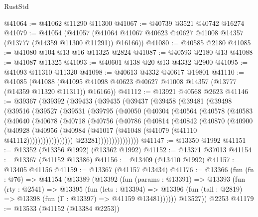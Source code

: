 \begin{lexlean}{RustStd}
\begin{coremodule}
@41064 := @41062 @11290 @11300
@41067 := @40739 @3521 @40742 @16274
@41079 := @41054
    (@41057 (@41064 @41067 @40623 @40627 @41008 @14357 (@13777 (@14359 @11300 @11291)) @16166))
@41080 := @40585 @2180
@41085 := @41080 @104 @13 @16 @11325 @2824
@41087 := @40593 @2180 @13
@41088 := @41087 @11325
@41093 := @40601 @138 @20 @13 @4332 @2900
@41095 := @41093 @11310 @11320
@41098 := @40613 @4332 @40617 @19801
@41110 := @41085
    (@41088 (@41095 @41098 @40623 @40627 @41008 @14357 (@13777 (@14359 @11320 @11311)) @16166))
@41112 := @13921 @40568 @2623
@41146 := @39367
    (@39392
      (@39433
        (@39435
          (@39437
            (@39458
              (@39481
                (@39498
                  (@39516
                    (@39527
                      (@39531
                        (@39795
                          (@40050
                            (@40304
                              (@40564
                                (@40578
                                  (@40583
                                    (@40640
                                      (@40678
                                        (@40718
                                          (@40756
                                            (@40786
                                              (@40814
                                                (@40842
                                                  (@40870
                                                    (@40900
                                                      (@40928
                                                        (@40956
                                                          (@40984
                                                            (@41017
                                                              (@41048
                                                                (@41079
                                                                  (@41110 @41112)))))))))))))))))
                                  @23281)))))))))))))))
@41147 := @13350 @1992
@41151 := @13352 (@13356 @1992) (@13362 @1992)
@41152 := @13371 @37013
@41154 := @13367 (@41152 @13386)
@41156 := @13409 (@13410 @1992)
@41157 := @13405 @41156
@41159 := @13367 (@41157 @13434)
@41176 := @13366
    (fun (fn : @76) =>
    @41154
      (@13389
        (@13392
          (fun (params : @13391) =>
          @13393
            (fun (rty : @2541) =>
            @13395
              (fun (lets : @13394) =>
              @13396 (fun (tail : @2819) => @13398 (fun (Γ : @13397) => @41159 @13481))))))
        @13527))
    @2253
@41179 := @13533 (@41152 (@13384 @2253))

\end{coremodule}
\end{lexlean}
